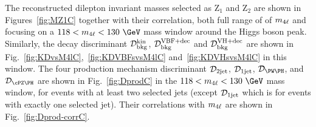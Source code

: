 {%


The reconstructed dilepton invariant masses selected as Z$_1$ and Z$_2$ are shown in Figures~\ref{fig:MZ1C} together with their correlation, both full range of of $m_{4\ell}$ and focusing on a $118<\mllll<130~\GeV$ mass window around the Higgs boson peak.
Similarly, the decay discriminant ${\cal D}^{\rm kin}_{\rm bkg}$, ${\mathcal{D}}^{\mathrm{VBF}+\mathrm{dec}}_{\mathrm{bkg}}$ and ${\mathcal{D}}^{\mathrm{VH}+\mathrm{dec}}_{\mathrm{bkg}}$ are shown in Fig.~\ref{fig:KDvsM4lC},~\ref{fig:KDVBFsvsM4lC} and~\ref{fig:KDVHsvsM4lC} in this window. %
The four production mechanism discriminant ${\mathcal D}_{\rm 2jet}$, ${\mathcal D}_{\rm 1jet}$, $\DMeWh$, and $\DMeZh$ are shown in Fig.~\ref{fig:DprodC} in the $118<\mllll<130~\GeV$ mass window, for events with at least two selected jets (except ${\mathcal D}_{\rm 1jet}$ which is for events with exactly one selected jet). 
Their correlations with $m_{4\ell}$ are shown in Fig.~\ref{fig:Dprod-corrC}. 

}
